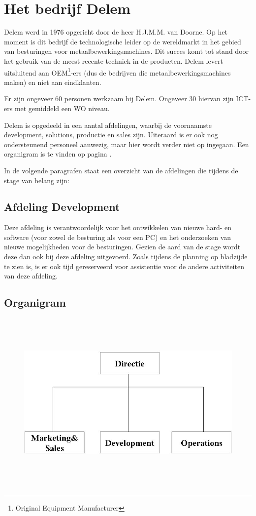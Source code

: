 \section[Delem]{Het bedrijf Delem}

Delem werd in 1976 opgericht door de heer H.J.M.M. van Doorne. Op het moment is dit bedrijf de technologische leider op de wereldmarkt in het gebied van besturingen voor metaalbewerkingsmachines. Dit succes komt tot stand door het gebruik van de meest recente techniek in de producten. Delem levert uitsluitend aan OEM\footnote{Original Equipment Manufacturer}-ers (dus de bedrijven die metaalbewerkingsmachines maken) en niet aan eindklanten.

Er zijn ongeveer 60 personen werkzaam bij Delem. Ongeveer 30 hiervan zijn ICT-ers met gemiddeld een WO niveau.

Delem is opgedeeld in een aantal afdelingen, waarbij de voornaamste development, solutions, productie en sales zijn. Uiteraard is er ook nog ondersteunend personeel aanwezig, maar hier wordt verder niet op ingegaan. Een organigram is te vinden op pagina \pageref{organigram}.

In de volgende paragrafen staat een overzicht van de afdelingen die tijdens de stage van belang zijn:

\subsection{Afdeling Development}

Deze afdeling is verantwoordelijk voor het ontwikkelen van nieuwe hard- en software (voor zowel de besturing als voor een PC) en het onderzoeken van nieuwe mogelijkheden voor de besturingen. Gezien de aard van de stage wordt deze dan ook bij deze afdeling uitgevoerd. Zoals tijdens de planning op bladzijde \pageref{planning} te zien is, is er ook tijd gereserveerd voor assistentie voor de andere activiteiten van deze afdeling.

\begin{landscape}
\subsection{Organigram}
\label{organigram}

\begin{figure}[h]{}
\includegraphics[width=18cm,height=9cm]{organisatie.jpg}
\end{figure}

\end{landscape}

\newpage
